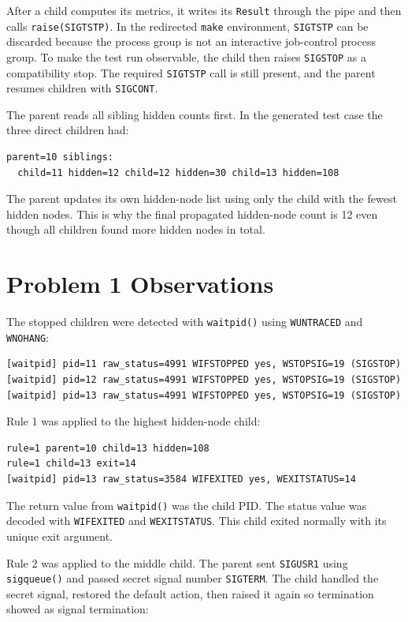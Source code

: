 \documentclass[11pt]{article}
\begin{document}
After a child computes its metrics, it writes its \texttt{Result} through the pipe and
then calls \texttt{raise(SIGTSTP)}. In the redirected \texttt{make} environment,
\texttt{SIGTSTP} can be discarded because the process group is not an interactive
job-control process group. To make the test run observable, the child then raises
\texttt{SIGSTOP} as a compatibility stop. The required \texttt{SIGTSTP} call is still
present, and the parent resumes children with \texttt{SIGCONT}.

The parent reads all sibling hidden counts first. In the generated test case the
three direct children had:

\begin{verbatim}
parent=10 siblings:
  child=11 hidden=12 child=12 hidden=30 child=13 hidden=108
\end{verbatim}

The parent updates its own hidden-node list using only the child with the fewest
hidden nodes. This is why the final propagated hidden-node count is 12 even though
all children found more hidden nodes in total.

\section{Problem 1 Observations}

The stopped children were detected with \texttt{waitpid()} using
\texttt{WUNTRACED} and \texttt{WNOHANG}:

\begin{verbatim}
[waitpid] pid=11 raw_status=4991 WIFSTOPPED yes, WSTOPSIG=19 (SIGSTOP)
[waitpid] pid=12 raw_status=4991 WIFSTOPPED yes, WSTOPSIG=19 (SIGSTOP)
[waitpid] pid=13 raw_status=4991 WIFSTOPPED yes, WSTOPSIG=19 (SIGSTOP)
\end{verbatim}

Rule 1 was applied to the highest hidden-node child:

\begin{verbatim}
rule=1 parent=10 child=13 hidden=108
rule=1 child=13 exit=14
[waitpid] pid=13 raw_status=3584 WIFEXITED yes, WEXITSTATUS=14
\end{verbatim}

The return value from \texttt{waitpid()} was the child PID. The status value was
decoded with \texttt{WIFEXITED} and \texttt{WEXITSTATUS}. This child exited normally
with its unique exit argument.

Rule 2 was applied to the middle child. The parent sent \texttt{SIGUSR1} using
\texttt{sigqueue()} and passed secret signal number \texttt{SIGTERM}. The child handled
the secret signal, restored the default action, then raised it again so termination
showed as signal termination:
\end{document}
